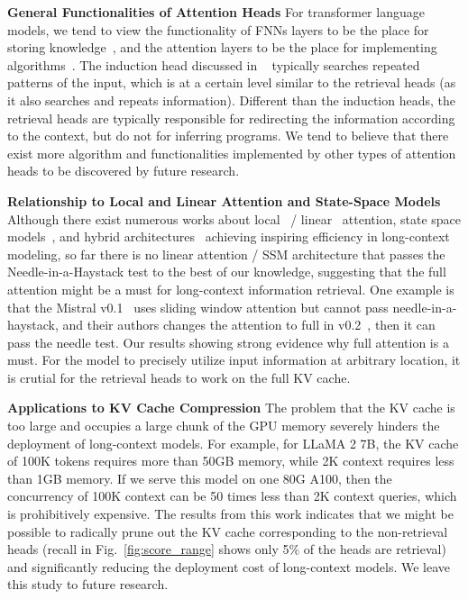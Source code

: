 \textbf{General Functionalities of Attention Heads}\quad\quad
For transformer language models, we tend to view the functionality of FNNs layers to be the place for storing knowledge~\citep{geva2020transformer}, and the attention layers to be the place for implementing algorithms~\citep{olsson2022context}. 
The induction head discussed in ~\citet{olsson2022context} typically searches repeated patterns of the input, which is at a certain level similar to the retrieval heads (as it also searches and repeats information). 
Different than the induction heads, the retrieval heads are typically responsible for redirecting the information according to the context, but do not for inferring programs. 
We tend to believe that there exist more algorithm and functionalities implemented by other types of attention heads to be discovered by future research.

\textbf{Relationship to Local and Linear Attention and State-Space Models}\quad\quad
Although there exist numerous works about local~\citep{xiao2023efficient} / linear~\citep{wang2020linformer} attention, state space models~\citep{gu2023mamba}, and hybrid architectures~\citep{de2024griffin} achieving inspiring efficiency in long-context modeling, so far there is no linear attention / SSM architecture that passes the Needle-in-a-Haystack test to the best of our knowledge, suggesting that the full attention might be a must for long-context information retrieval. 
One example is that the Mistral v0.1~\citep{jiang2023mistral} uses sliding window attention but cannot pass needle-in-a-haystack, and their authors changes the attention to full in v0.2~\citep{mistralv02}, then it can pass the needle test. 
Our results showing strong evidence why full attention is a must.  
For the model to precisely utilize input information at arbitrary location, it is crutial for the retrieval heads to work on the full KV cache.

\textbf{Applications to KV Cache Compression}\quad\quad
The problem that the KV cache is too large and occupies a large chunk of the GPU memory severely hinders the deployment of long-context models.
For example, for LLaMA 2 7B, the KV cache of 100K tokens requires more than 50GB memory, while 2K context requires less than 1GB memory. 
If we serve this model on one 80G A100, then the concurrency of 100K context can be 50 times less than 2K context queries, which is prohibitively expensive. 
The results from this work indicates that we might be possible to radically prune out the KV cache corresponding to the non-retrieval heads (recall in Fig.~\ref{fig:score_range} shows only 5\% of the heads are retrieval) and significantly reducing the deployment cost of long-context models. 
We leave this study to future research.
